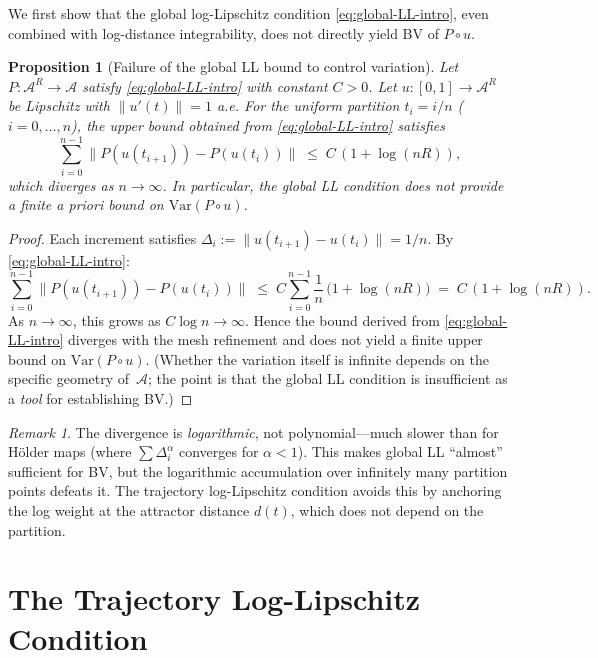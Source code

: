 \documentclass[12pt,a4paper]{article}
\theoremstyle{definition}
\theoremstyle{plain}
\newtheorem{proposition}[definition]{Proposition}
\theoremstyle{remark}
\newtheorem{remark}[definition]{Remark}
\newcommand{\Var}{\mathrm{Var}}
\begin{document}
We first show that the global log-Lipschitz condition
\eqref{eq:global-LL-intro}, even combined with log-distance
integrability, does not directly yield BV of $P \circ u$.

\begin{proposition}[Failure of the global LL bound to control variation]
\label{prop:divergence}
Let $P: \mathcal{A}^R \to \mathcal{A}$ satisfy
\eqref{eq:global-LL-intro} with constant $C > 0$.  Let
$u: [0,1] \to \mathcal{A}^R$ be Lipschitz with
$\|u'(t)\| = 1$ a.e.  For the uniform partition
$t_i = i/n$ ($i = 0, \ldots, n$), the upper bound obtained
from \eqref{eq:global-LL-intro} satisfies
\[
  \sum_{i=0}^{n-1} \|P(u(t_{i+1})) - P(u(t_i))\|
  \;\le\;
  C\,(1 + \log(nR)),
\]
which diverges as $n \to \infty$.  In particular, the global LL
condition does not provide a finite \emph{a priori} bound on
$\Var(P \circ u)$.
\end{proposition}

\begin{proof}
Each increment satisfies $\Delta_i := \|u(t_{i+1}) - u(t_i)\| = 1/n$.
By \eqref{eq:global-LL-intro}:
\[
  \sum_{i=0}^{n-1} \|P(u(t_{i+1})) - P(u(t_i))\|
  \;\le\;
  C \sum_{i=0}^{n-1} \frac{1}{n}\,
  \bigl(1 + \log(nR)\bigr)
  \;=\;
  C\,(1 + \log(nR)).
\]
As $n \to \infty$, this grows as $C\log n \to \infty$.
Hence the bound derived from \eqref{eq:global-LL-intro}
diverges with the mesh refinement and does not yield a finite
upper bound on $\Var(P \circ u)$.  (Whether the variation
itself is infinite depends on the specific geometry
of~$\mathcal{A}$; the point is that the global LL condition
is insufficient as a \emph{tool} for establishing BV.)
\end{proof}

\begin{remark}
The divergence is \emph{logarithmic}, not polynomial---much slower
than for H\"older maps (where $\sum \Delta_i^\alpha$ converges for
$\alpha < 1$).  This makes global LL ``almost'' sufficient for BV,
but the logarithmic accumulation over infinitely many partition
points defeats it.  The trajectory log-Lipschitz condition avoids
this by anchoring the log weight at the attractor distance $d(t)$,
which does not depend on the partition.
\end{remark}


\section{The Trajectory Log-Lipschitz Condition}
\label{sec:TLL}
\end{document}
